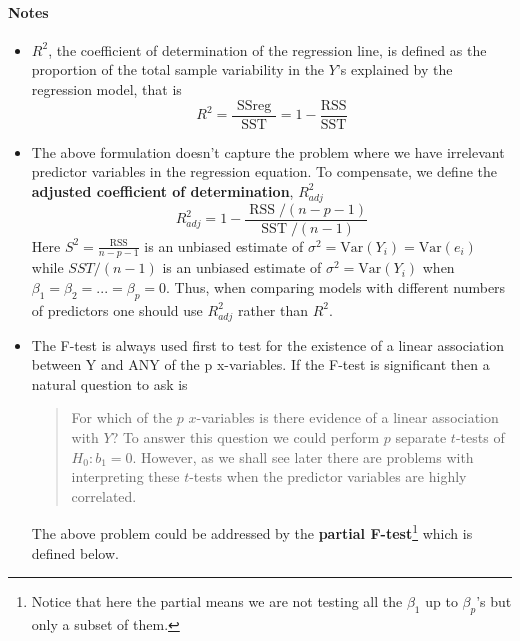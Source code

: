\documentclass[11pt]{article}
\begin{document}
\paragraph{Notes}
\begin{itemize}
    \item $R^2$, the coefficient of determination of the regression line, is defined as the proportion of the total sample variability in the $Y$'s explained by the regression model, that is 
        \begin{equation*}
            R^{2}=\frac{\text { SSreg }}{\mathrm{SST}}=1-\frac{\mathrm{RSS}}{\mathrm{SST}}
        \end{equation*}
    \item The above formulation doesn't capture the problem where we have irrelevant predictor variables in the regression equation. To compensate, we define the \textbf{adjusted coefficient of determination}, $R_{adj}^2$
        \begin{equation*}
            R_{{adj}}^{2}=1-\frac{\operatorname{RSS} /(n-p-1)}{\operatorname{SST} /(n-1)} 
        \end{equation*}
        Here $S^2 = \frac{\mathrm{RSS}}{n-p-1}$ is an unbiased estimate of $\sigma^2 = \mathrm{Var}(Y_i) = \mathrm{Var}(e_i)$ while $SST/(n-1)$ is an unbiased estimate of $\sigma^2 = \mathrm{Var}(Y_i)$ when $\beta_1 = \beta_2 = ... = \beta_p = 0$. \color{BurntOrange} Thus, when comparing models with different numbers of predictors one should use $R_{{adj}}^{2}$ rather than $R^2$. \color{Black}
    \item The F-test is always used first to test for the existence of a linear association between Y and ANY of the p x-variables. If the F-test is significant then a natural question to ask is
        \begin{quote}
            For which of the $p$ $x$-variables is there evidence of a linear association with $Y$? To answer this question we could perform $p$ separate $t$-tests of $H_0 : b_1 = 0$. However, as we shall see later there are problems with interpreting these $t$-tests when the predictor variables are highly correlated.
        \end{quote}
        The above problem could be addressed by the \textbf{partial F-test}\footnote{Notice that here the partial means we are not testing all the $\beta_1$ up to $\beta_p$'s but only a subset of them.} which is defined below.
        
\end{itemize}
\end{document}
